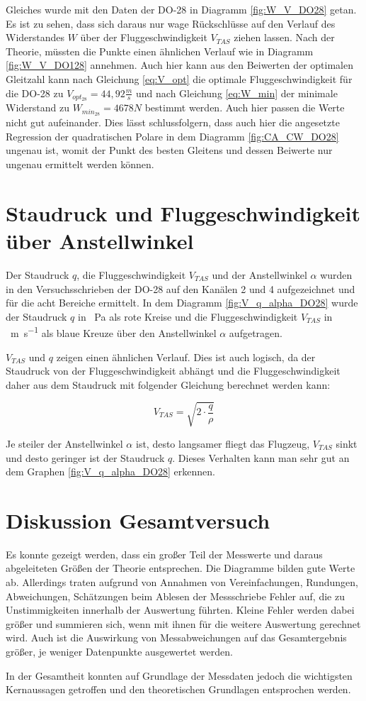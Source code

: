 Gleiches wurde mit den Daten der DO-28 in Diagramm \ref{fig:W_V_DO28} getan. Es ist zu sehen, dass sich daraus nur wage Rückschlüsse auf den Verlauf des Widerstandes $W$ über der Fluggeschwindigkeit $V_{TAS}$ ziehen lassen. Nach der Theorie, müssten die Punkte einen ähnlichen Verlauf wie in Diagramm \ref{fig:W_V_DO128} annehmen. Auch hier kann aus den Beiwerten der optimalen Gleitzahl kann nach Gleichung \ref{eq:V_opt} die optimale Fluggeschwindigkeit für die DO-28 zu $V_{opt_{28}} = 44,92 \frac{m}{s}$ und nach Gleichung \ref{eq:W_min} der minimale Widerstand zu $W_{min_{28}} = 4678 N$ bestimmt werden. Auch hier passen die Werte nicht gut aufeinander. Dies lässt schlussfolgern, dass auch hier die angesetzte Regression der quadratischen Polare in dem Diagramm \ref{fig:CA_CW_DO28} ungenau ist, womit der Punkt des besten Gleitens und dessen Beiwerte nur ungenau ermittelt werden können.

\section{Staudruck und Fluggeschwindigkeit über Anstellwinkel}
Der Staudruck $q$, die Fluggeschwindigkeit $V_{TAS}$ und der Anstellwinkel $\alpha$ wurden in den Versuchsschrieben der DO-28 auf den Kanälen 2 und 4 aufgezeichnet und für die acht Bereiche ermittelt. In dem Diagramm \ref{fig:V_q_alpha_DO28} wurde der Staudruck $q$ in \SI{}{\pascal} als rote Kreise und die Fluggeschwindigkeit $V_{TAS}$ in \SI{}{\meter \per \second} als blaue Kreuze über den Anstellwinkel $\alpha$ aufgetragen.

$V_{TAS}$ und $q$ zeigen einen ähnlichen Verlauf. Dies ist auch logisch, da der Staudruck von der Fluggeschwindigkeit abhängt und die Fluggeschwindigkeit daher aus dem Staudruck mit folgender Gleichung berechnet werden kann:

\begin{equation}
V_{TAS} = \sqrt{2 \cdot \frac{q}{\rho}}
\end{equation}

Je steiler der Anstellwinkel $\alpha$ ist, desto langsamer fliegt das Flugzeug, $V_{TAS}$ sinkt und desto geringer ist der Staudruck $q$. Dieses Verhalten kann man sehr gut an dem Graphen \ref{fig:V_q_alpha_DO28} erkennen. 


\section{Diskussion Gesamtversuch}
Es konnte gezeigt werden, dass ein großer Teil der Messwerte und daraus abgeleiteten Größen der Theorie entsprechen. Die Diagramme bilden gute Werte ab. Allerdings traten aufgrund von Annahmen von Vereinfachungen, Rundungen, Abweichungen, Schätzungen beim Ablesen der Messschriebe Fehler auf, die zu Unstimmigkeiten innerhalb der Auswertung führten. Kleine Fehler werden dabei größer und summieren sich, wenn mit ihnen für die weitere Auswertung gerechnet wird. Auch ist die Auswirkung von Messabweichungen auf das Gesamtergebnis größer, je weniger Datenpunkte ausgewertet werden.  

In der Gesamtheit konnten auf Grundlage der Messdaten jedoch die wichtigsten Kernaussagen getroffen und den theoretischen Grundlagen entsprochen werden. 